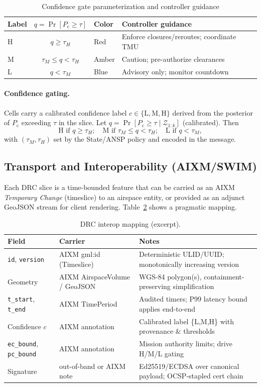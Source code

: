 \documentclass[journal]{new-aiaa}
\newcommand{\Pc}{\ensuremath{P_\mathrm{c}}}
\newcommand{\AIXM}{\textsc{AIXM}}
\newcommand{\SWIM}{\textsc{SWIM}}
\begin{document}
\begin{table}[h!]
\centering
\caption{Confidence gate parameterization and controller guidance}
\label{tab:confidence_gates}
\begin{tabular}{@{}lclp{4.8cm}@{}}
\toprule
Label & $q=\Pr[\Pc\ge\tau]$ & Color & Controller guidance \\
\midrule
H & $q \ge \tau_H$ & Red & Enforce closures/reroutes; coordinate TMU \\
M & $\tau_M \le q < \tau_H$ & Amber & Caution; pre-authorize clearances \\
L & $q < \tau_M$ & Blue & Advisory only; monitor countdown \\
\bottomrule
\end{tabular}
\end{table}

\paragraph{Confidence gating.}
Cells carry a calibrated confidence label $c\in\{\text{L},\text{M},\text{H}\}$ derived from the posterior of \Pc{} exceeding $\tau$ in the slice. Let $q=\Pr[\Pc \ge \tau \mid \mathcal{Z}_{1:k}]$ (calibrated). Then
\[
\text{H if } q \ge \tau_H;\quad \text{M if } \tau_M \le q < \tau_H;\quad \text{L if } q < \tau_M,
\]
with $(\tau_M,\tau_H)$ set by the State/ANSP policy and encoded in the message.

\subsection{Transport and Interoperability (\AIXM/\SWIM)}
Each DRC slice is a time-bounded feature that can be carried as an \AIXM{} \emph{Temporary Change} (timeslice) to an airspace entity, or provided as an adjunct GeoJSON stream for client rendering. Table~\ref{tab:interop} shows a pragmatic mapping.

\begin{table}[h!]
\centering
\caption{DRC interop mapping (excerpt).}
\label{tab:interop}
\begin{tabular}{@{}llp{6.5cm}@{}}
\toprule
Field & Carrier & Notes \\
\midrule
\texttt{id}, \texttt{version} & AIXM gml:id (Timeslice) & Deterministic ULID/UUID; monotonically increasing version \\
Geometry & AIXM AirspaceVolume / GeoJSON & WGS-84 polygon(s), containment-preserving simplification \\
\texttt{t\_start}, \texttt{t\_end} & AIXM TimePeriod & Audited timers; P99 latency bound applies end-to-end \\
Confidence $c$ & AIXM annotation & Calibrated label \{L,M,H\} with provenance \& thresholds \\
\texttt{ec\_bound}, \texttt{pc\_bound} & AIXM annotation & Mission authority limits; drive H/M/L gating \\
Signature & out-of-band or AIXM note & Ed25519/ECDSA over canonical payload; OCSP-stapled cert chain \\
\bottomrule
\end{tabular}
\end{table}
\end{document}
